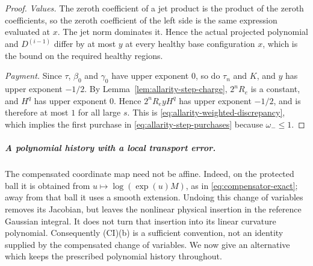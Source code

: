 \begin{proof}
\emph{Values.} The zeroth coefficient of a jet product is the product of
the zeroth coefficients, so the zeroth coefficient of the left side is the
same expression evaluated at $x$. The jet norm dominates it. Hence the
actual projected polynomial and $D^{(i-1)}$ differ by at most $y$ at
every healthy base configuration $x$, which is the bound on the required
healthy regions.

\emph{Payment.} Since $\tau$, $\beta_0$ and $\gamma_0$ have upper exponent
$0$, so do $\tau_n$ and $K$, and $y$ has upper exponent $-1/2$. By
Lemma~\ref{lem:allarity-step-charge}, $2^nR_e$ is a constant, and $H^{q}$
has upper exponent $0$. Hence $2^nR_eyH^{q}$ has upper exponent $-1/2$,
and is therefore at most $1$ for all large $s$. This is
\eqref{eq:allarity-weighted-discrepancy}, which implies the first purchase
in \eqref{eq:allarity-step-purchases} because $\omega_-\le1$.
\end{proof}

\subparagraph{A polynomial history with a local transport error.}
The compensated coordinate map need not be affine. Indeed, on the protected
ball it is obtained from
$u\mapsto\log(\exp(u)M)$, as in
\eqref{eq:compensator-exact}; away from that ball it uses a smooth extension.
Undoing this change of variables removes its Jacobian, but leaves the
nonlinear physical insertion in the reference Gaussian integral.
It does not turn that insertion into its linear curvature polynomial.
Consequently (CI)(b) is a sufficient convention, not an identity supplied
by the compensated change of variables. We now give an alternative which
keeps the prescribed polynomial history throughout.

